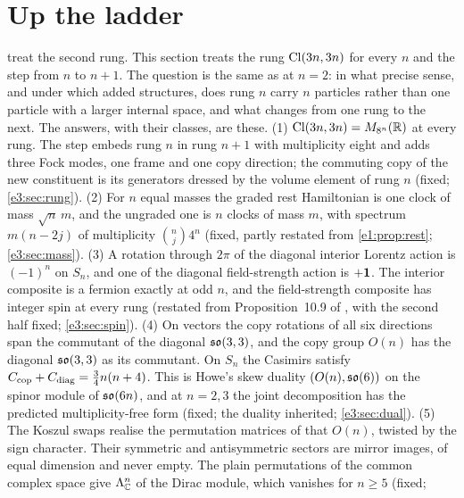 \section{Up the ladder}
\label{e3:sec:main}

 treat the second rung. This section treats the rung $\mathrm{Cl}(3n,3n)$ for every $n$ and the step from $n$ to
$n+1$. The question is the same as at $n=2$: in what precise sense, and under which added structures, does rung $n$ carry $n$ particles
rather than one particle with a larger internal space, and what changes from one rung to the next. The answers, with their classes, are
these. (1) $\mathrm{Cl}(3n,3n)=M_{8^n}(\mathbb{R})$ at every rung. The step embeds rung $n$ in rung $n+1$ with multiplicity eight and adds three Fock
modes, one frame and one copy direction; the commuting copy of the new constituent is its generators dressed by the volume element of
rung $n$ (fixed; \cref{e3:sec:rung}). (2) For $n$ equal masses the graded rest Hamiltonian is one clock of mass $\sqrt n\,m$, and the
ungraded one is $n$ clocks of mass $m$, with spectrum $m(n-2j)$ of multiplicity $\binom nj4^n$ (fixed, partly restated from
\cref{e1:prop:rest}; \cref{e3:sec:mass}). (3) A rotation through $2\pi$ of the diagonal interior Lorentz action is $(-1)^n$ on $S_n$, and one
of the diagonal field-strength action is $+\mathbf 1$. The interior composite is a fermion exactly at odd $n$, and the field-strength composite
has integer spin at every rung (restated from Proposition~10.9 of \cite{ES17}, with the second half fixed; \cref{e3:sec:spin}). (4) On vectors
the copy rotations of all six directions span the commutant of the diagonal $\mathfrak{so}(3,3)$, and the copy group $O(n)$ has the diagonal $\mathfrak{so}(3,3)$
as its commutant. On $S_n$ the Casimirs satisfy $C_{\rm cop}+C_{\rm diag}=\tfrac34n(n+4)$. This is Howe's skew duality $(O(n),\mathfrak{so}(6))$ on the spinor module of $\mathfrak{so}(6n)$, and at
$n=2,3$ the joint decomposition has the predicted multiplicity-free form (fixed; the duality inherited; \cref{e3:sec:dual}). (5) The Koszul
swaps realise the permutation matrices of that $O(n)$, twisted by the sign character. Their symmetric and antisymmetric sectors are mirror images, of equal dimension and
never empty. The plain permutations of the common complex space give $\Lambda^n_{\mathbb{C}}$ of the Dirac module, which vanishes for $n\ge5$ (fixed;

